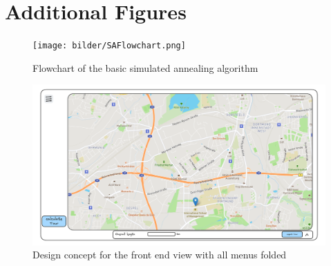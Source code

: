 \chapter{Additional Figures}



\begin{figure}
\texttt{[image: bilder/SAFlowchart.png]}
\caption{Flowchart of the basic simulated annealing algorithm}
\label{fig:SAFlowchart}
\end{figure}




\begin{figure}[H]
	\includegraphics[width=0.9\linewidth]{bilder/Concept burger menu and stats hidden.png}
	\caption{Design concept for the front end view with all menus folded}
	\label{fig:frontendConceptMenusClosed}
\end{figure}


